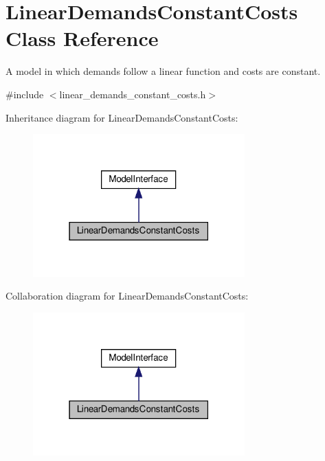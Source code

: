 \hypertarget{classLinearDemandsConstantCosts}{}\section{Linear\+Demands\+Constant\+Costs Class Reference}
\label{classLinearDemandsConstantCosts}


A model in which demands follow a linear function and costs are constant.  




{\ttfamily \#include $<$linear\+\_\+demands\+\_\+constant\+\_\+costs.\+h$>$}



Inheritance diagram for Linear\+Demands\+Constant\+Costs\+:\nopagebreak
\begin{figure}[H]
\begin{center}
\leavevmode
\includegraphics[width=231pt]{classLinearDemandsConstantCosts__inherit__graph}
\end{center}
\end{figure}


Collaboration diagram for Linear\+Demands\+Constant\+Costs\+:\nopagebreak
\begin{figure}[H]
\begin{center}
\leavevmode
\includegraphics[width=231pt]{classLinearDemandsConstantCosts__coll__graph}
\end{center}
\end{figure}
